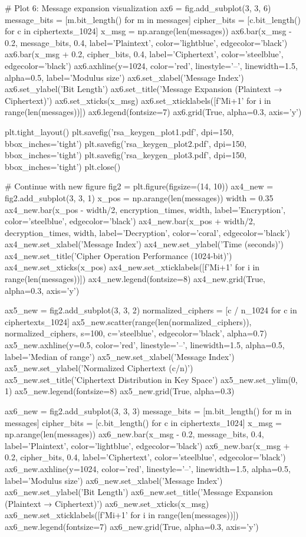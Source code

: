 \documentclass[a4paper, 11pt]{article}
\begin{document}
\begin{pycode}
# Plot 6: Message expansion visualization
ax6 = fig.add_subplot(3, 3, 6)
message_bits = [m.bit_length() for m in messages]
cipher_bits = [c.bit_length() for c in ciphertexts_1024]
x_msg = np.arange(len(messages))
ax6.bar(x_msg - 0.2, message_bits, 0.4, label='Plaintext',
        color='lightblue', edgecolor='black')
ax6.bar(x_msg + 0.2, cipher_bits, 0.4, label='Ciphertext',
        color='steelblue', edgecolor='black')
ax6.axhline(y=1024, color='red', linestyle='--', linewidth=1.5,
            alpha=0.5, label='Modulus size')
ax6.set_xlabel('Message Index')
ax6.set_ylabel('Bit Length')
ax6.set_title('Message Expansion (Plaintext → Ciphertext)')
ax6.set_xticks(x_msg)
ax6.set_xticklabels([f'M{i+1}' for i in range(len(messages))])
ax6.legend(fontsize=7)
ax6.grid(True, alpha=0.3, axis='y')

plt.tight_layout()
plt.savefig('rsa_keygen_plot1.pdf', dpi=150, bbox_inches='tight')
plt.savefig('rsa_keygen_plot2.pdf', dpi=150, bbox_inches='tight')
plt.savefig('rsa_keygen_plot3.pdf', dpi=150, bbox_inches='tight')
plt.close()

# Continue with new figure
fig2 = plt.figure(figsize=(14, 10))
ax4_new = fig2.add_subplot(3, 3, 1)
x_pos = np.arange(len(messages))
width = 0.35
ax4_new.bar(x_pos - width/2, encryption_times, width, label='Encryption',
        color='steelblue', edgecolor='black')
ax4_new.bar(x_pos + width/2, decryption_times, width, label='Decryption',
        color='coral', edgecolor='black')
ax4_new.set_xlabel('Message Index')
ax4_new.set_ylabel('Time (seconds)')
ax4_new.set_title('Cipher Operation Performance (1024-bit)')
ax4_new.set_xticks(x_pos)
ax4_new.set_xticklabels([f'M{i+1}' for i in range(len(messages))])
ax4_new.legend(fontsize=8)
ax4_new.grid(True, alpha=0.3, axis='y')

ax5_new = fig2.add_subplot(3, 3, 2)
normalized_ciphers = [c / n_1024 for c in ciphertexts_1024]
ax5_new.scatter(range(len(normalized_ciphers)), normalized_ciphers, s=100,
            c='steelblue', edgecolor='black', alpha=0.7)
ax5_new.axhline(y=0.5, color='red', linestyle='--', linewidth=1.5,
            alpha=0.5, label='Median of range')
ax5_new.set_xlabel('Message Index')
ax5_new.set_ylabel('Normalized Ciphertext (c/n)')
ax5_new.set_title('Ciphertext Distribution in Key Space')
ax5_new.set_ylim(0, 1)
ax5_new.legend(fontsize=8)
ax5_new.grid(True, alpha=0.3)

ax6_new = fig2.add_subplot(3, 3, 3)
message_bits = [m.bit_length() for m in messages]
cipher_bits = [c.bit_length() for c in ciphertexts_1024]
x_msg = np.arange(len(messages))
ax6_new.bar(x_msg - 0.2, message_bits, 0.4, label='Plaintext',
        color='lightblue', edgecolor='black')
ax6_new.bar(x_msg + 0.2, cipher_bits, 0.4, label='Ciphertext',
        color='steelblue', edgecolor='black')
ax6_new.axhline(y=1024, color='red', linestyle='--', linewidth=1.5,
            alpha=0.5, label='Modulus size')
ax6_new.set_xlabel('Message Index')
ax6_new.set_ylabel('Bit Length')
ax6_new.set_title('Message Expansion (Plaintext → Ciphertext)')
ax6_new.set_xticks(x_msg)
ax6_new.set_xticklabels([f'M{i+1}' for i in range(len(messages))])
ax6_new.legend(fontsize=7)
ax6_new.grid(True, alpha=0.3, axis='y')
\end{pycode}
\end{document}

